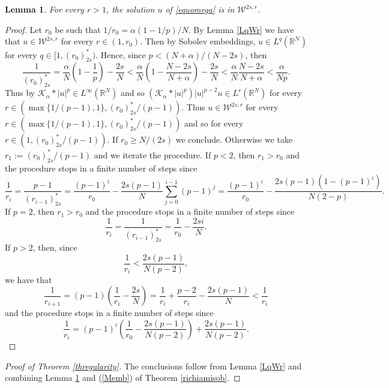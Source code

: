 \documentclass[10pt]{amsart}
\numberwithin{equation}{section}
\newtheorem{lemma}[theorem]{Lemma}
\begin{document}
\begin{lemma}
\label{leWr}
For every $r>1$, the solution $u$ of \eqref{equomega} is in $\mathcal{W}^{2s,r}$. 
\end{lemma}
\begin{proof}
Let $r_0$ be such that $1/r_0 = \alpha(1-1/p)/N$. By Lemma \ref{LqWr} we have that $u\in \mathcal{W}^{2s,r}$ for every $r\in(1,r_0)$. Then by Sobolev embeddings, $u\in L^{q}(\mathbb{R}^N)$ for every $q\in[1,(r_0)^*_{2s})$. 
Hence, since $p<(N+\alpha)/(N-2s)$, then
\[
\frac{1}{(r_0)^*_{2s}}
=
\frac{\alpha}{N}\left(1-\frac{1}{p}\right) - \frac{2s}{N}
<
\frac{\alpha}{N}\left(1-\frac{N-2s}{N+\alpha}\right) - \frac{2s}{N}
<
\frac{\alpha}{N}\frac{N-2s}{N+\alpha}
<
\frac{\alpha}{Np}.
\]                                           
Thus by $\mathcal{K}_\alpha * |u|^p\in L^\infty(\mathbb{R}^N)$ and so $(\mathcal{K}_\alpha * |u|^p)|u|^{p-2}u \in L^r (\mathbb{R}^N)$ for every $r\in(\max\{1/(p-1),1\},(r_0)^*_{2s}/(p-1))$. Thus $u\in\mathcal{W}^{2s,r}$ for every $r\in(\max\{1/(p-1),1\},(r_0)^*_{2s}/(p-1))$ and so for every $r\in(1,(r_0)^*_{2s}/(p-1))$. If $r_0\geq N/(2s)$ we conclude. Otherwise we take $r_1:=(r_0)^*_{2s}/(p-1)$ and we iterate the procedure. If $p< 2$, then $r_1 > r_0$ and the procedure stops in a finite number of steps since 
\begin{equation*}                      
\frac{1}{r_i}                                
=
\frac{p-1}{(r_{i-1})^*_{2s}}                
=\frac{(p-1)^i}{r_0} - \frac{2s(p-1)}{N}\sum_{j=0}^{i-1}(p-1)^j
=
\frac{(p-1)^i}{r_0}
- \frac{2s(p-1)(1-(p-1)^i)}{N(2-p)}.
\end{equation*}
If $p=2$, then $r_1 > r_0$ and the procedure stops in a finite number of steps since 
\[                     
\frac{1}{r_i}                                
=
\frac{1}{(r_{i-1})^*_{2s}}                
=\frac{1}{r_0} - \frac{2si}{N}.
\]
If $p>2$, then, since
\[
\frac{1}{r_i} < \frac{2s(p-1)}{N(p-2)},
\]
we have that
\[
\frac{1}{r_{i+1}}=(p-1)\left(\frac{1}{r_i}-\frac{2s}{N}\right)
=\frac{1}{r_i} + \frac{p-2}{r_i}-\frac{2s(p-1)}{N}
<\frac{1}{r_i}
\]
and the procedure stops in a finite number of steps since 
\[
\frac{1}{r_i}=(p-1)^i\left(\frac{1}{r_0}-\frac{2s(p-1)}{N(p-2)}\right)
+ \frac{2s(p-1)}{N(p-2)}.
\]
\end{proof}

\begin{proof}[Proof of Theorem \ref{thregularity}]
The conclusions follow from Lemma \ref{LqWr} and combining Lemma \ref{leWr} and (\ref{Memb}) of Theorem \ref{richiamisob}.
\end{proof}
\end{document}
